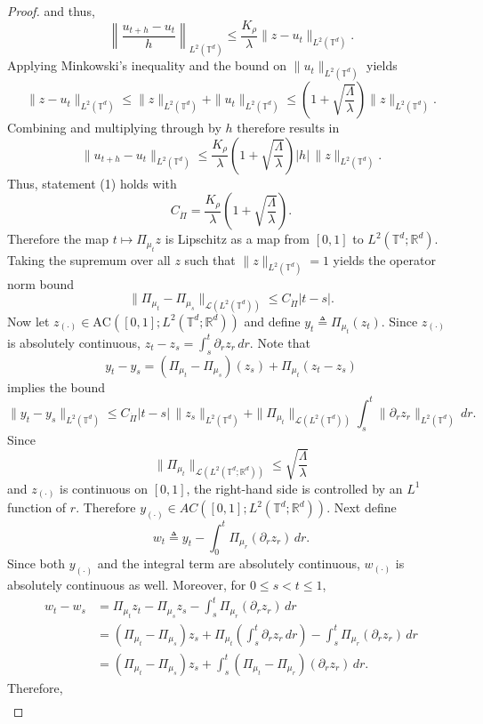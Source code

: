 \documentclass[11pt]{article}
\begin{document}
\begin{proof}
and thus,
\[
\left\|\frac{u_{t+h}-u_t}{h}\right\|_{L^2(\mathbb{T}^d)}
\le
\frac{K_\rho}{\lambda}\|z-u_t\|_{L^2(\mathbb{T}^d)}.
\]
Applying Minkowski's inequality and the bound on $\|u_t\|_{L^2(\mathbb{T}^d)}$ yields
\[
\|z-u_t\|_{L^2(\mathbb{T}^d)}
\le
\|z\|_{L^2(\mathbb{T}^d)}+\|u_t\|_{L^2(\mathbb{T}^d)}
\le
\left(1+\sqrt{\frac{\Lambda}{\lambda}}\right)\|z\|_{L^2(\mathbb{T}^d)}.
\]
Combining and multiplying through by $h$ therefore results in 
\[
\|u_{t+h}-u_t\|_{L^2(\mathbb{T}^d)}
\le
\frac{K_\rho}{\lambda}
\left(1+\sqrt{\frac{\Lambda}{\lambda}}\right)|h|\,\|z\|_{L^2(\mathbb{T}^d)}.
\]
Thus, statement (1) holds with \[C_{\dot \Pi} = \frac{K_\rho}{\lambda}
\left(1+\sqrt{\frac{\Lambda}{\lambda}}\right).\]
Therefore the map $t \mapsto \Pi_{\mu_t}z$ is Lipschitz as a map from $[0,1]$ to $L^2(\mathbb{T}^d; \mathbb{R}^d)$. Taking the supremum over all $z$ such that $\|z\|_{L^2(\mathbb{T}^d)} = 1$ yields the operator norm bound 
\[
\|\Pi_{\mu_t} - \Pi_{\mu_s}\|_{\mathcal{L}(L^2(\mathbb{T}^d))}
\le
C_{\dot \Pi}|t - s|.
\]
Now let $z_{(\cdot)} \in \text{AC}([0,1]; L^2(\mathbb{T}^d; \mathbb{R}^d))$ and define $y_t \triangleq \Pi_{\mu_t}(z_t).$ Since $z_{(\cdot)}$ is absolutely continuous, $z_t - z_s= \int_{s}^t \partial_r z_r \, dr$. Note that
\[y_t - y_s = (\Pi_{\mu_t} - \Pi_{\mu_s})(z_s) + \Pi_{\mu_t}(z_t-z_s)\]
implies the bound
\[
\|y_t-y_s\|_{L^2(\mathbb{T}^d)}
\le
C_{\dot\Pi}|t-s|\,\|z_s\|_{L^2(\mathbb{T}^d)}
+
\|\Pi_{\mu_t}\|_{\mathcal L(L^2(\mathbb{T}^d))}\int_s^t\|\partial_r z_r\|_{L^2(\mathbb{T}^d)}\,dr.
\]
Since
\[
\|\Pi_{\mu_t}\|_{\mathcal L(L^2(\mathbb{T}^d;\mathbb R^d))}
\le \sqrt{\frac{\Lambda}{\lambda}}
\]
and $z_{(\cdot)}$ is continuous on $[0,1]$, the right-hand side is controlled by
an $L^1$ function of $r$. Therefore $y_{(\cdot)}\in AC([0,1];L^2(\mathbb{T}^d;\mathbb R^d))$. Next define
\[
w_t
\triangleq
y_t-\int_0^t \Pi_{\mu_r}(\partial_r z_r)\,dr.
\]
Since both $y_{(\cdot)}$ and the integral term are absolutely continuous,
$w_{(\cdot)}$ is absolutely continuous as well. Moreover, for $0\le s<t\le 1$,
\begin{align*}
w_t-w_s
&=
\Pi_{\mu_t}z_t-\Pi_{\mu_s}z_s-\int_s^t \Pi_{\mu_r}(\partial_r z_r)\,dr \\
&=
(\Pi_{\mu_t}-\Pi_{\mu_s})z_s
+
\Pi_{\mu_t}\!\left(\int_s^t \partial_r z_r\,dr\right)
-
\int_s^t \Pi_{\mu_r}(\partial_r z_r)\,dr \\
&=
(\Pi_{\mu_t}-\Pi_{\mu_s})z_s
+
\int_s^t(\Pi_{\mu_t}-\Pi_{\mu_r})(\partial_r z_r)\,dr.
\end{align*}
Therefore,
\begin{align*}

\end{align*}
\end{proof}
\end{document}
